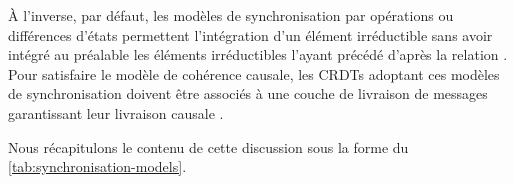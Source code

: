 À l'inverse, par défaut, les modèles de synchronisation par opérations ou différences d'états permettent l'intégration d'un élément irréductible sans avoir intégré au préalable les éléments irréductibles l'ayant précédé d'après la relation \hb.
Pour satisfaire le modèle de cohérence causale, les \acp{CRDT} adoptant ces modèles de synchronisation doivent être associés à une couche de livraison de messages garantissant leur livraison causale .

Nous récapitulons le contenu de cette discussion sous la forme du \autoref{tab:synchronisation-models}.

\begin{table}[!ht]
  \centering
  \caption{Récapitulatif comparatif des différents modèles de synchronisation pour \acp{CRDT}}
  \label{tab:synchronisation-models}
\end{table}
